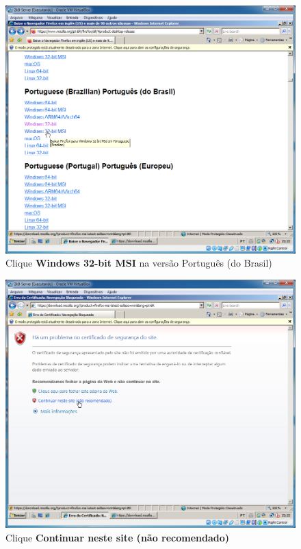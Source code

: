 \documentclass[10pt]{article}
\begin{document}
\begin{figure}[H]
    \centering
    \caption{Clique \textbf{Windows 32-bit MSI} na versão Português (do Brasil)}
    \label{fig:re058}
    \includegraphics[width=\linewidth]{images/rede_externa/re058.png}
\end{figure}
\begin{figure}[H]
    \centering
    \caption{Clique \textbf{Continuar neste site (não recomendado)}}
    \label{fig:re059}
    \includegraphics[width=\linewidth]{images/rede_externa/re059.png}
\end{figure}
\end{document}
